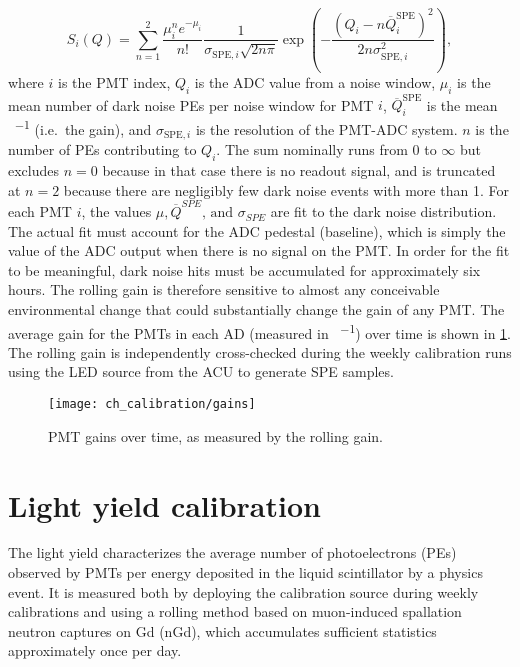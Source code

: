 \begin{equation}
    S_i(Q) = \sum_{n=1}^2 \frac{\mu_i^n e^{-\mu_i}}{n!}
    \frac{1}{\sigma_{\text{SPE},i}\sqrt{2n\pi}}
    \exp
    \left(
        -\frac{(Q_i-n\overline{Q}_i^{\text{SPE}})^2}{2n\sigma^2_{\text{SPE},i}}
    \right),
\end{equation}
where $i$ is the PMT index,
$Q_i$ is the ADC value from a noise window,
$\mu_i$ is the mean number of dark noise PEs per noise window for PMT $i$,
$\overline{Q}_i^{\text{SPE}}$ is the mean \si{\adc\per\pe} (i.e.\ the gain),
and $\sigma_{\text{SPE},i}$ is the resolution of the PMT-ADC system.
$n$ is the number of PEs contributing to $Q_i$.
The sum nominally runs from $0$ to $\infty$ but
excludes $n=0$ because in that case there is no readout signal,
and is truncated at $n=2$ because there are negligibly few dark noise events
with more than \SI{1}{\pe}.
For each PMT $i$, the values $\mu,\overline{Q}^{SPE}\text{, and }\sigma_{SPE}$ are fit
to the dark noise distribution.
The actual fit must account for the ADC pedestal (baseline),
which is simply the value of the ADC output when there is no signal on the PMT.
In order for the fit to be meaningful, dark noise hits must be accumulated
for approximately six hours.
The rolling gain is therefore sensitive to almost any conceivable
environmental change that could substantially change the gain of any PMT.
The average gain for the PMTs in each AD (measured in \si{\adc\per\pe})
over time is shown in \cref{fig:gain}.
The rolling gain is independently cross-checked during the weekly calibration runs
using the LED source from the ACU to generate SPE samples.

\begin{figure}
    \centering
    \texttt{[image: ch\_calibration/gains]}
    \caption[PMT gains over time]{PMT gains over time, as measured by the rolling gain.}
    \label{fig:gain}
\end{figure}


\section{Light yield calibration}
\label{sec:light_yield_calib}

The light yield characterizes the average
number of photoelectrons (PEs) observed by PMTs
per energy deposited in the liquid scintillator
by a physics event.
It is measured both by deploying the  calibration source
during weekly calibrations
and using a rolling method based on muon-induced spallation neutron
captures on Gd (nGd), which accumulates sufficient statistics
approximately once per day.

